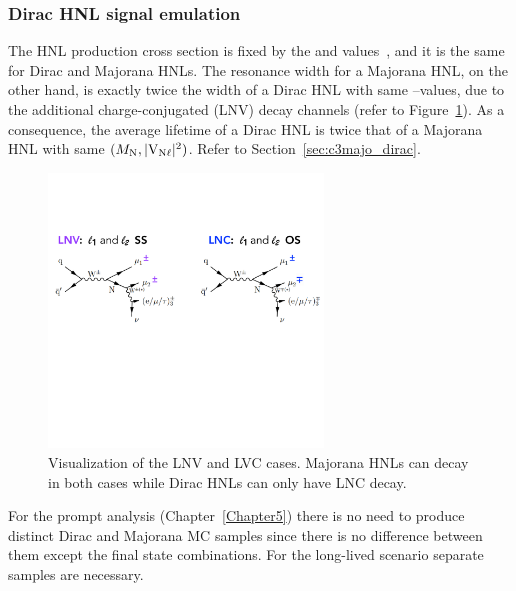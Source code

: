\subsubsection{Dirac HNL signal emulation}\label{sec:c4diracmajo}
The HNL production cross section is fixed by the \mhnl and \mixpar
values~\cite{Degrande_2016,heavyN}, and it is the same for Dirac and
Majorana HNLs.
The resonance width for a Majorana HNL, on the other hand, is exactly
twice the width of a Dirac HNL with same \mhnl--\mixpar values, due to
the additional charge-conjugated (LNV) decay channels (refer to Figure~\ref{fig:dirac_majo}).
As a consequence, the average lifetime of a Dirac HNL is twice that of
a Majorana HNL with same $(M_{\mathrm{N}},\mathrm{|V_{\mathrm{N}\ell}|^2})$. Refer
to Section~\ref{sec:c3majo_dirac}.
\begin{figure}[h!]
\centering
 \includegraphics[clip,trim=0cm 7cm 0cm 3cm, width=0.65\textwidth]{Figures/c4/dirac_majo2}
  \caption{Visualization of the LNV and LVC cases. Majorana HNLs
    can decay in both cases while Dirac HNLs can only have LNC decay.}
  \label{fig:dirac_majo}
\end{figure}

For the prompt analysis (Chapter~\ref{Chapter5}) there is no 
need to produce distinct Dirac and Majorana MC samples since there is
no difference between them except the final state combinations. For the
long-lived scenario separate samples are necessary.

